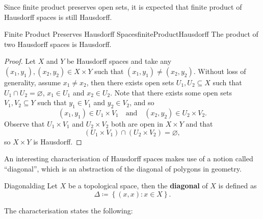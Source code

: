 \documentclass[math]{amznotes}
\theoremstyle{remark}
\begin{document}
Since finite product preserves open sets, it is expected that finite product of Hausdorff spaces is still Hausdorff.
\begin{probox}{Finite Product Preserves Hausdorff Spaces}{finiteProductHausdorff}
    The product of two Hausdorff spaces is Hausdorff.
    \tcblower
    \begin{proof}
        Let $X$ and $Y$ be Hausdorff spaces and take any $\left(x_1, y_1\right), \left(x_2, y_2\right) \in X \times Y$ such that $\left(x_1, y_1\right) \neq \left(x_2, y_2\right)$. Without loss of generality, assume $x_1 \neq x_2$, then there exists open sets $U_1, U_2 \subseteq X$ such that $U_1 \cap U_2 = \varnothing$, $x_1 \in U_1$ and $x_2 \in U_2$. Note that there exists some open sets $V_1, V_2 \subseteq Y$ such that $y_1 \in V_1$ and $y_2 \in V_2$, and so 
        \begin{equation*}
            \left(x_1, y_1\right) \in U_1 \times V_1 \quad \textrm{and} \quad \left(x_2, y_2\right) \in U_2 \times V_2.
        \end{equation*}
        Observe that $U_1 \times V_1$ and $U_2 \times V_2$ both are open in $X \times Y$ and that
        \begin{equation*}
            \left(U_1 \times V_1\right) \cap \left(U_2 \times V_2\right) = \varnothing,
        \end{equation*}
        so $X \times Y$ is Hausdorff.
    \end{proof}
\end{probox}
An interesting characterisation of Hausdorff spaces makes use of a notion called ``diagonal'', which is an abstraction of the diagonal of polygons in geometry.
\begin{dfnbox}{Diagonal}{diag}
    Let $X$ be a topological space, then the {\color{red} \textbf{diagonal}} of $X$ is defined as 
    \begin{equation*}
        \Delta \coloneqq \left\{\left(x, x\right) \colon x \in X\right\}.
    \end{equation*}
\end{dfnbox}
The characterisation states the following:
\end{document}
